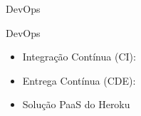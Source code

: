\begin{frame}{{\sffamily DevOps}}
\begin{block}{DevOps}
    \begin{itemize}
        \item Integração Contínua (CI):
        \item Entrega Contínua (CDE):
        \item Solução PaaS do Heroku
    \end{itemize}
\end{block}
\end{frame}
